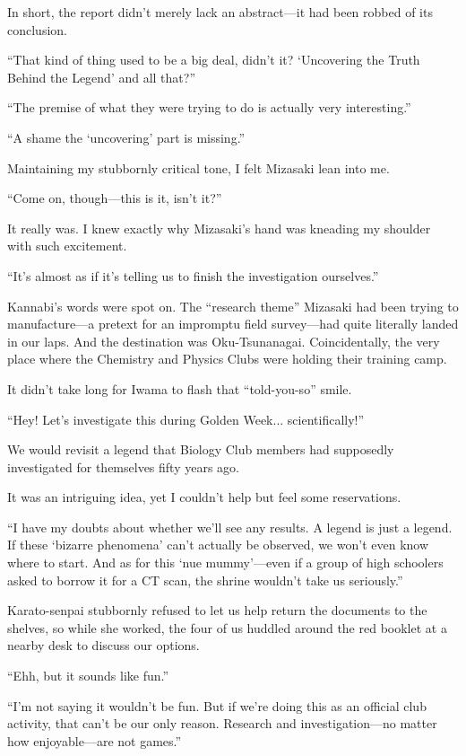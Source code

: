 \documentclass[
    a4paper,
    12pt,
    twoside,
    openany,
    UTF8,
    fontset=windows
]{ctexbook}
\begin{document}
In short, the report didn't merely lack an abstract---it had been robbed of its conclusion.

``That kind of thing used to be a big deal, didn't it? `Uncovering the Truth Behind the Legend' and all that?''

``The premise of what they were trying to do is actually very interesting.''

``A shame the `uncovering' part is missing.''

Maintaining my stubbornly critical tone, I felt Mizasaki lean into me.

``Come on, though---this is it, isn't it?''

It really was. I knew exactly why Mizasaki's hand was kneading my shoulder with such excitement.

``It's almost as if it's telling us to finish the investigation ourselves.''

Kannabi's words were spot on. The ``research theme'' Mizasaki had been trying to manufacture---a pretext for an impromptu field survey---had quite literally landed in our laps. And the destination was Oku-Tsunanagai. Coincidentally, the very place where the Chemistry and Physics Clubs were holding their training camp.

It didn't take long for Iwama to flash that ``told-you-so'' smile.

``Hey! Let's investigate this during Golden Week... scientifically!''

We would revisit a legend that Biology Club members had supposedly investigated for themselves fifty years ago.

It was an intriguing idea, yet I couldn't help but feel some reservations.

``I have my doubts about whether we'll see any results. A legend is just a legend. If these `bizarre phenomena' can't actually be observed, we won't even know where to start. And as for this `nue mummy'---even if a group of high schoolers asked to borrow it for a CT scan, the shrine wouldn't take us seriously.''

Karato-senpai stubbornly refused to let us help return the documents to the shelves, so while she worked, the four of us huddled around the red booklet at a nearby desk to discuss our options.

``Ehh, but it sounds like fun.''

``I'm not saying it wouldn't be fun. But if we're doing this as an official club activity, that can't be our only reason. Research and investigation---no matter how enjoyable---are not games.''
\end{document}
